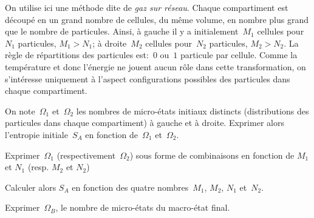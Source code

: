 On utilise ici une méthode dite de {\em gaz sur réseau}.
Chaque compartiment est découpé en un grand nombre de cellules, du 
même volume, en nombre
plus grand que le nombre de particules.
Ainsi, à gauche il y a initialement~$M_1$ cellules pour~$N_1$
particules, $M_1>N_1$; à droite~$M_2$ cellules pour~$N_2$ particules, $M_2>N_2$.
La règle de répartitions des particules est:~$0$ ou~$1$ particule par cellule. Comme la température et donc l'énergie ne jouent aucun rôle dans cette transformation, on s'intéresse uniquement à l'aspect configurations possibles des particules dans chaque compartiment.

\medskip

\question
On note~$\Omega_1$ et~$\Omega_2$ les nombres de micro-états initiaux distincts (distributions des particules dans chaque compartiment) à
gauche et à droite. Exprimer alors l'entropie initiale~$S_A$ en
fonction de~$\Omega_1$ et~$\Omega_2$.

\question
Exprimer~$\Omega_1$ (respectivement~$\Omega_2$) sous forme de combinaisons en fonction de $M_1$ et $N_1$ (resp. $M_2$ et $N_2$)

\question
Calculer alors $S_A$ en fonction des quatre nombres~$M_1$, $M_2$,
$N_1$ et~$N_2$.

\question
Exprimer~$\Omega_B$, le nombre de micro-états du macro-état final.

